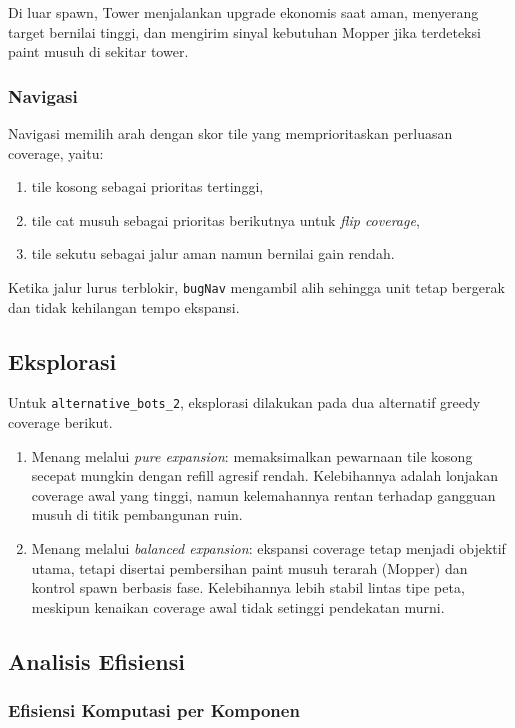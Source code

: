 Di luar spawn, Tower menjalankan upgrade ekonomis saat aman, menyerang target bernilai tinggi, dan mengirim sinyal kebutuhan Mopper jika terdeteksi paint musuh di sekitar tower.

\subsubsection{Navigasi}

Navigasi memilih arah dengan skor tile yang memprioritaskan perluasan coverage, yaitu:
\begin{enumerate}
    \item tile kosong sebagai prioritas tertinggi,
    \item tile cat musuh sebagai prioritas berikutnya untuk \textit{flip coverage},
    \item tile sekutu sebagai jalur aman namun bernilai gain rendah.
\end{enumerate}

Ketika jalur lurus terblokir, \texttt{bugNav} mengambil alih sehingga unit tetap bergerak dan tidak kehilangan tempo ekspansi.

\subsection{Eksplorasi}

Untuk \texttt{alternative\_bots\_2}, eksplorasi dilakukan pada dua alternatif greedy coverage berikut.
\begin{enumerate}
    \item Menang melalui \textit{pure expansion}: memaksimalkan pewarnaan tile kosong secepat mungkin dengan refill agresif rendah. Kelebihannya adalah lonjakan coverage awal yang tinggi, namun kelemahannya rentan terhadap gangguan musuh di titik pembangunan ruin.
    \item Menang melalui \textit{balanced expansion}: ekspansi coverage tetap menjadi objektif utama, tetapi disertai pembersihan paint musuh terarah (Mopper) dan kontrol spawn berbasis fase. Kelebihannya lebih stabil lintas tipe peta, meskipun kenaikan coverage awal tidak setinggi pendekatan murni.
\end{enumerate}

\subsection{Analisis Efisiensi}

\subsubsection{Efisiensi Komputasi per Komponen}

